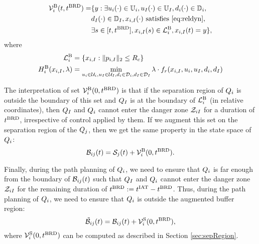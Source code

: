 \begin{equation} \label{eqn:buffBRS}
\begin{aligned}
\brs^{\text{B}}_{i}(t, \brd) = & \{y: \exists \ctrl_i(\cdot) \in \cfset_i, \ctrl_\intr(\cdot) \in \cfset_\intr, \dstb_i(\cdot) \in \dfset_i, \\
& \dstb_\intr(\cdot) \in \dfset_\intr, \state_{i, \intr}(\cdot) \text{ satisfies \eqref{eq:reldyn}},\\
& \exists s \in [t, \brd], \state_{i, \intr}(s) \in \targetset^{\text{B}}_{i}, \state_{i, \intr}(t) = y\},
\end{aligned}
\end{equation}
where 
\begin{equation}
\begin{aligned}
\mathcal{L}^{\text{B}}_{i} &= \{x_{i, I}: \|p_{i, I}\|_2 \le R_c\} \\
H^{\text{B}}_{i}(x_{i, I}, \lambda) &= \min_{u_i \in \mathcal{U}_i, u_I \in \mathcal{U}_I, d_i \in \mathcal{D}_i, d_I \in \mathcal{D}_I} \lambda \cdot f_r(x_{i, I}, u_i, u_I, d_i, d_I)
\end{aligned}
\end{equation}

The interpretation of set $\mathcal{V}^{\text{B}}_{i}(0, t^\text{BRD})$ is that if the separation region of $Q_i$ is outside the boundary of this set and $Q_{I}$ is at the boundary of $\mathcal{L}^{\text{B}}_{i}$ (in relative coordinates), then $Q_{I}$ and $Q_{i}$ cannot enter the danger zone $\mathcal{Z}_{iI}$ for a duration of $t^\text{BRD}$, irrespective of control applied by them. If we augment this set on the separation region of the $Q_j$, then we get the same property in the state space of $Q_i$:
\begin{equation} \label{eqn:buffRegion}
\buff_{ij}(t) = \sep_j(t) + \brs^{\text{B}}_{i}(0, \brd).
\end{equation} 

Finally, during the path planning of $Q_i$, we need to ensure that $Q_i$ is far enough from the boundary of $\mathcal{B}_{ij}(t)$ such that $Q_{I}$ and $Q_{i}$ cannot enter the danger zone $\mathcal{Z}_{iI}$ for the remaining duration of $t^\text{BRD} := t^\text{IAT} - t^\text{BRD}$.  Thus, during the path planning of $Q_i$, we need to ensure that $Q_i$ is outside the augmented buffer region:
\begin{equation} \label{eqn:augbuffRegion1}
\tilde{\buff}_{ij}(t) = \buff_{ij}(t) + \brs^{\text{S}}_{i}(0, \trd),
\end{equation}
where $\mathcal{V}^{\text{S}}_{i}(0, t^\text{BRD})$ can be computed as described in Section \ref{sec:sepRegion}.

